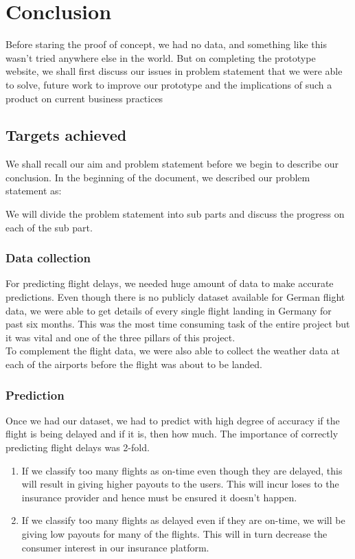 \chapter{Conclusion}
Before staring the proof of concept, we had no data, and something like this wasn't tried anywhere else in the world. But on completing the prototype website, we shall first discuss our issues in problem statement that we were able to solve, future work to improve our prototype and the implications of such a product on current business practices



\section{Targets achieved}
We shall recall our aim and problem statement before we begin to describe our conclusion. In the beginning of the document, we described our problem statement as:

We will divide the problem statement into sub parts and discuss the progress on each of the sub part.

\subsection{Data collection}
For predicting flight delays, we needed huge amount of data to make accurate predictions. Even though there is no publicly dataset available for German flight data, we were able to get details of every single flight landing in Germany for past six months. This was the most time consuming task of the entire project but it was vital and one of the three pillars of this project.
\\ To complement the flight data, we were also able to collect the weather data at each of the airports before the flight was about to be landed. 

\subsection{Prediction}
Once we had our dataset, we had to predict with high degree of accuracy if the flight is being delayed and if it is, then how much. The importance of correctly predicting flight delays was 2-fold.
\begin{enumerate}
    \item If we  classify too many flights as on-time even though they are delayed, this will result in giving higher payouts to the users. This will incur loses to the insurance provider and hence must be ensured it doesn't happen.
    \item If we classify too many flights as delayed even if they are on-time, we will be giving low payouts for many of the flights. This will in turn decrease the consumer interest in our insurance platform.
\end{enumerate}

